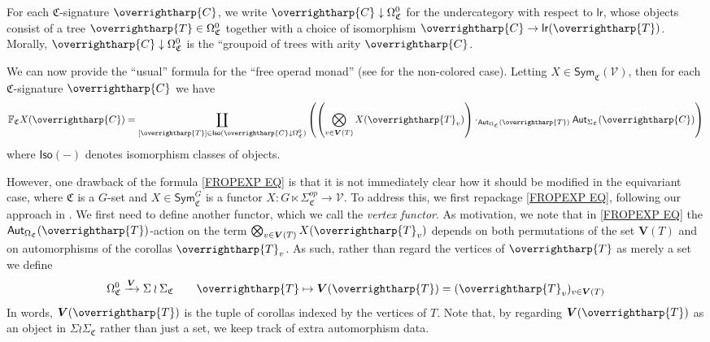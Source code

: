 \documentclass[a4paper,10pt
,draft
]{article}%
\numberwithin{equation}{section}
\numberwithin{figure}{section}
\theoremstyle{definition} %
\newcommand{\vect}[1]{\text{\overrightharp{\ensuremath{#1}}}}
\newcommand{\V}{\ensuremath{\mathcal V}}
\newcommand{\1}{\ensuremath{\mathbbm 1}}%
\begin{document}
For each $\mathfrak{C}$-signature $\vect{C}$,
we write $\vect{C} \downarrow \Omega_{\mathfrak{C}}^0$
for the undercategory with respect to $\mathsf{lr}$, 
whose objects consist of a tree $\vect{T}\in \Omega_{\mathfrak{C}}^0$
together with a choice of isomorphism 
$\vect{C} \to \mathsf{lr}(\vect{T})$.
Morally, $\vect{C} \downarrow \Omega_{\mathfrak{C}}^0$
is the ``groupoid of trees with arity $\vect{C}$. 

We can now provide the ``usual'' formula for the ``free operad monad''
(see \cite[page 816]{BM07} for the non-colored case).
Letting $X \in \mathsf{Sym}_{\mathfrak{C}}(\V)$,
then for each $\mathfrak{C}$-signature $\vect{C}$ we have
\begin{equation}\label{FROPEXP EQ}
\mathbb{F}_{\mathfrak{C}} X (\vect{C})
=
\coprod_{[\vect{T}] \in 
\mathsf{Iso}(\vect{C} \downarrow \Omega^0_{\mathfrak{C}})}
\left(
\left(
\bigotimes_{v \in \boldsymbol{V}(T)} X(\vect{T}_v)
\right)
\cdot_{\mathsf{Aut}_{\Omega_{\mathfrak{C}}}(\vect{T})}
\mathsf{Aut}_{\Sigma_{\mathfrak{C}}}(\vect{C})
\right)
\end{equation}
where $\mathsf{Iso}(-)$ denotes isomorphism classes of objects.

However, one drawback of the formula  
\eqref{FROPEXP EQ}
is that it is not immediately clear how it should be modified 
in the equivariant case,
where $\mathfrak{C}$ is a $G$-set
and $X \in \mathsf{Sym}^G_{\mathfrak{C}}$
is a functor 
$X \colon G \ltimes \Sigma_{\mathfrak{C}}^{op} \to \V$.
To address this, we first repackage \eqref{FROPEXP EQ}, 
following our approach in \cite[\S 4]{BP_geo}.
We first need to define another functor, which we call the \emph{vertex functor}.
As motivation, we note that
in \eqref{FROPEXP EQ}
the $\mathsf{Aut}_{\Omega_{\mathfrak{C}}}(\vect{T})$-action
on the term
$\bigotimes_{v \in \boldsymbol{V}(T)} X(\vect{T}_v)$
depends on both permutations 
of the set $\boldsymbol{V}(T)$
and on automorphisms of the corollas $\vect{T}_v$.
As such, rather than regard the vertices of $\vect{T}$ as merely a set
we define 
\begin{equation}\label{VFUNDEF EQ}
\Omega_{\mathfrak{C}}^0 \xrightarrow{\boldsymbol{V}} \Sigma \wr \Sigma_{\mathfrak{C}}
\qquad 
\vect{T} \mapsto 
\boldsymbol{V}(\vect{T})=(\vect{T}_v )_{v \in \boldsymbol{V}(T)}
\end{equation}
In words, $\boldsymbol{V}(\vect{T})$
is the tuple of corollas indexed by the vertices of $T$. 
Note that,
by regarding $\boldsymbol{V}(\vect{T})$ as an object in 
$\Sigma \wr \Sigma_{\mathfrak{C}}$ rather than just a set,
we keep track of extra automorphism data.
\end{document}
